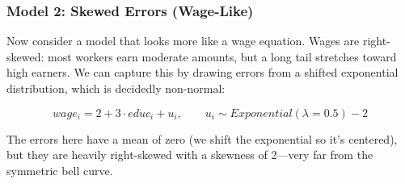 \documentclass[
  letterpaper,
  DIV=11,
  numbers=noendperiod]{scrreprt}
\newenvironment{Shaded}{\begin{snugshade}}{\end{snugshade}}
\newcommand{\AttributeTok}[1]{\textcolor[rgb]{0.40,0.45,0.13}{#1}}
\newcommand{\CommentTok}[1]{\textcolor[rgb]{0.37,0.37,0.37}{#1}}
\newcommand{\ControlFlowTok}[1]{\textcolor[rgb]{0.00,0.23,0.31}{\textbf{#1}}}
\newcommand{\DecValTok}[1]{\textcolor[rgb]{0.68,0.00,0.00}{#1}}
\newcommand{\FunctionTok}[1]{\textcolor[rgb]{0.28,0.35,0.67}{#1}}
\newcommand{\NormalTok}[1]{\textcolor[rgb]{0.00,0.23,0.31}{#1}}
\newcommand{\OtherTok}[1]{\textcolor[rgb]{0.00,0.23,0.31}{#1}}
\newcommand{\SpecialCharTok}[1]{\textcolor[rgb]{0.37,0.37,0.37}{#1}}
\newcommand{\StringTok}[1]{\textcolor[rgb]{0.13,0.47,0.30}{#1}}
\begin{document}
\begin{Shaded}
\end{Shaded}

\subsubsection{Model 2: Skewed Errors
(Wage-Like)}\label{model-2-skewed-errors-wage-like}

Now consider a model that looks more like a wage equation. Wages are
right-skewed: most workers earn moderate amounts, but a long tail
stretches toward high earners. We can capture this by drawing errors
from a shifted exponential distribution, which is decidedly non-normal:

\[wage_i = 2 + 3 \cdot educ_i + u_i, \qquad u_i \sim Exponential(\lambda = 0.5) - 2\]

The errors here have a mean of zero (we shift the exponential so it's
centered), but they are heavily right-skewed with a skewness of 2---very
far from the symmetric bell curve.
\end{document}
